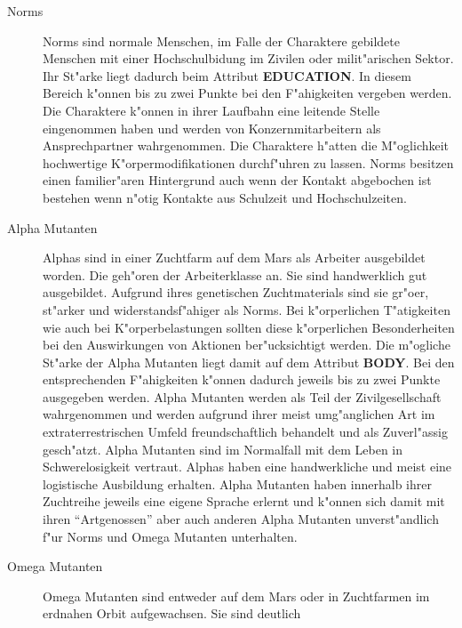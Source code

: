\begin{description}
    \item[Norms] Norms sind normale Menschen, im Falle der Charaktere gebildete Menschen mit einer Hochschulbidung im Zivilen oder 
        milit"arischen Sektor. Ihr St"arke liegt dadurch beim Attribut \textbf{EDUCATION}. In diesem Bereich k"onnen bis zu zwei Punkte bei den F"ahigkeiten vergeben werden. Die Charaktere k"onnen in ihrer Laufbahn eine leitende Stelle eingenommen haben und werden von Konzernmitarbeitern als Ansprechpartner wahrgenommen. Die Charaktere h"atten die M"oglichkeit hochwertige K"orpermodifikationen durchf"uhren zu lassen. Norms besitzen einen familier"aren Hintergrund auch wenn der Kontakt abgebochen ist bestehen wenn n"otig Kontakte aus Schulzeit und Hochschulzeiten.
    \item[Alpha Mutanten] Alphas sind in einer Zuchtfarm auf dem Mars als Arbeiter ausgebildet worden. Die geh"oren der
        Arbeiterklasse an. Sie sind handwerklich gut ausgebildet. Aufgrund ihres genetischen Zuchtmaterials sind sie gr"o\3er, st"arker und widerstandsf"ahiger als Norms. Bei k"orperlichen T"atigkeiten wie auch bei K"orperbelastungen sollten diese k"orperlichen Besonderheiten bei den Auswirkungen von Aktionen ber"ucksichtigt werden. Die m"ogliche St"arke der Alpha Mutanten liegt damit auf dem Attribut \textbf{BODY}. Bei den entsprechenden F"ahigkeiten k"onnen dadurch jeweils bis zu zwei Punkte ausgegeben werden. Alpha Mutanten werden als Teil der Zivilgesellschaft wahrgenommen und werden aufgrund ihrer meist umg"anglichen Art im extraterrestrischen Umfeld freundschaftlich behandelt und als Zuverl"assig gesch"atzt. Alpha Mutanten sind im Normalfall mit dem Leben in Schwerelosigkeit vertraut. Alphas haben eine handwerkliche und meist eine logistische Ausbildung erhalten. Alpha Mutanten haben innerhalb ihrer Zuchtreihe jeweils eine eigene Sprache erlernt und k"onnen sich damit mit ihren "`Artgenossen"' aber auch anderen Alpha Mutanten unverst"andlich f"ur Norms und Omega Mutanten unterhalten. 
    \item[Omega Mutanten] Omega Mutanten sind entweder auf dem Mars oder in Zuchtfarmen im erdnahen Orbit aufgewachsen. Sie sind deutlich   

\end{description}
